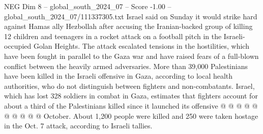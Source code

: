 \begin{textsample}{NEG Dim 8 – global\_south\_2024\_07 – Score -1.00 – global\_south\_2024\_07/111337305.txt}
Israel said on Sunday it would strike hard against Hamas ally Hezbollah after accusing the Iranian-backed group of killing 12 children and teenagers in a rocket attack on a football pitch in the Israeli-occupied Golan Heights.
The attack escalated tensions in the hostilities, which have been fought in parallel to the Gaza war and have raised fears of a full-blown conflict between the heavily armed adversaries.
More than 39,000 Palestinians have been killed in the Israeli offensive in Gaza, according to local health authorities, who do not distinguish between fighters and non-combatants.
Israel, which has lost 328 soldiers in combat in Gaza, estimates that fighters account for about a third of the Palestinians killed since it launched its offensive @ @ @ @ @ @ @ @ @ @ October.
About 1,200 people were killed and 250 were taken hostage in the Oct. 7 attack, according to Israeli tallies.

\end{textsample}
